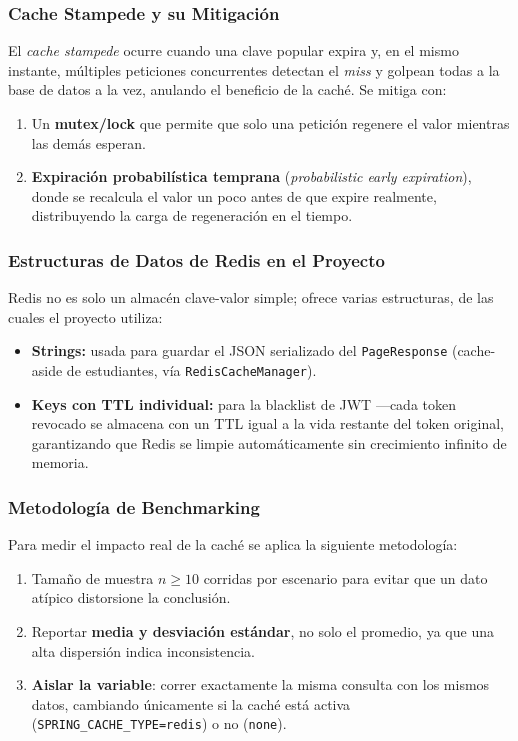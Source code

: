 \documentclass[12pt]{article}
\begin{document}
	\subsubsection*{Cache Stampede y su Mitigación}
	
	El \textit{cache stampede} ocurre cuando una clave popular expira y, en el mismo instante, múltiples peticiones concurrentes detectan el \textit{miss} y golpean todas a la base de datos a la vez, anulando el beneficio de la caché. Se mitiga con:
	
	\begin{enumerate}
		\item Un \textbf{mutex/lock} que permite que solo una petición regenere el valor mientras las demás esperan.
		\item \textbf{Expiración probabilística temprana} (\textit{probabilistic early expiration}), donde se recalcula el valor un poco antes de que expire realmente, distribuyendo la carga de regeneración en el tiempo.
	\end{enumerate}
	
	\subsubsection*{Estructuras de Datos de Redis en el Proyecto}
	
	Redis no es solo un almacén clave-valor simple; ofrece varias estructuras, de las cuales el proyecto utiliza:
	
	\begin{itemize}
		\item \textbf{Strings:} usada para guardar el JSON serializado del \texttt{PageResponse} (cache-aside de estudiantes, vía \texttt{RedisCacheManager}).
		\item \textbf{Keys con TTL individual:} para la blacklist de JWT —cada token revocado se almacena con un TTL igual a la vida restante del token original, garantizando que Redis se limpie automáticamente sin crecimiento infinito de memoria.
	\end{itemize}
	
	\subsubsection*{Metodología de Benchmarking}
	
	Para medir el impacto real de la caché se aplica la siguiente metodología:
	
	\begin{enumerate}
		\item Tamaño de muestra $n \geq 10$ corridas por escenario para evitar que un dato atípico distorsione la conclusión.
		\item Reportar \textbf{media y desviación estándar}, no solo el promedio, ya que una alta dispersión indica inconsistencia.
		\item \textbf{Aislar la variable}: correr exactamente la misma consulta con los mismos datos, cambiando únicamente si la caché está activa (\texttt{SPRING\_CACHE\_TYPE=redis}) o no (\texttt{none}).
	\end{enumerate}
	
\end{document}

